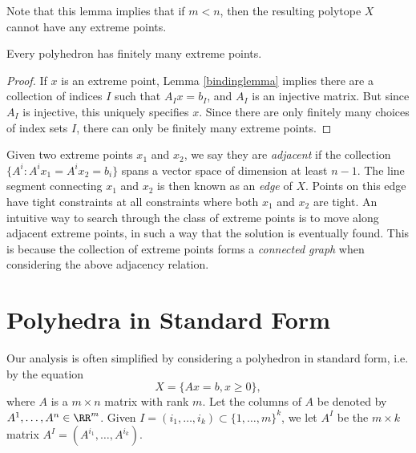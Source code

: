 \begin{remark}
    Note that this lemma implies that if $m < n$, then the resulting polytope $X$ cannot have any extreme points.
\end{remark}

\begin{corollary}
    Every polyhedron has finitely many extreme points.
\end{corollary}
\begin{proof}
    If $x$ is an extreme point, Lemma \ref{bindinglemma} implies there are a collection of indices $I$ such that $A_I x = b_I$, and $A_I$ is an injective matrix. But since $A_I$ is injective, this uniquely specifies $x$. Since there are only finitely many choices of index sets $I$, there can only be finitely many extreme points.
\end{proof}


Given two extreme points $x_1$ and $x_2$, we say they are \emph{adjacent} if the collection $\{ A^i: A^i x_1 = A^i x_2 = b_i \}$ spans a vector space of dimension at least $n - 1$. The line segment connecting $x_1$ and $x_2$ is then known as an \emph{edge} of $X$. Points on this edge have tight constraints at all constraints where both $x_1$ and $x_2$ are tight. An intuitive way to search through the class of extreme points is to move along adjacent extreme points, in such a way that the solution is eventually found. This is because the collection of extreme points forms a \emph{connected graph} when considering the above adjacency relation.

\section{Polyhedra in Standard Form}

Our analysis is often simplified by considering a polyhedron in standard form, i.e. by the equation
%
\[ X = \{ Ax = b, x \geq 0 \}, \]
%
where $A$ is a $m \times n$ matrix with rank $m$. Let the columns of $A$ be denoted by $A^1, \dots, A^n \in \RR^m$. Given $I = (i_1, \dots, i_k) \subset \{ 1, \dots, m \}^k$, we let $A^I$ be the $m \times k$ matrix $A^I = (A^{i_1}, \dots, A^{i_k})$.

